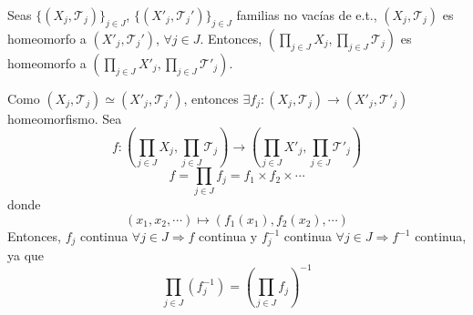 \begin{ejr}[36]
  Seas $\{ ( X_{j}, \mathcal{T}_{j} ) \}_{j \in J}$, $\{ ( X'_{j}, \mathcal{T}_{j}' ) \}_{j \in J}$ familias no vacías de e.t., $( X_{j}, \mathcal{T}_{j} )$ es homeomorfo a $( X'_{j}, \mathcal{T}_{j}' )$, $\forall j \in J$. Entonces, $( \prod_{j \in J} X_{j}, \prod_{j \in J} \mathcal{T}_{j} )$ es homeomorfo a $( \prod_{j \in J} X'_{j}, \prod_{j \in J} \mathcal{T}'_{j} )$.
\end{ejr}

\begin{sol}
  Como $( X_{j}, \mathcal{T}_{j} ) \simeq( X'_{j}, \mathcal{T}_{j}' )$, entonces $\exists f_{j} : ( X_{j}, \mathcal{T}_{j} ) \to ( X'_{j}, \mathcal{T'}_{j} )$ homeomorfismo. Sea
  \[
    f : ( \prod_{j \in J} X_{j}, \prod_{j \in J} \mathcal{T}_{j} ) \to ( \prod_{j \in J} X'_{j}, \prod_{j \in J} \mathcal{T'}_{j} )
  \]
  \[ 
    f = \prod_{j \in J} f_{j} = f_{1} \times f_{2} \times \cdots 
  \] 
  donde
  \[ 
    (x_{1}, x_{2}, \cdots) \mapsto (f_{1}(x_{1}), f_{2}(x_{2}), \cdots)
  \] 
  Entonces, $f_{j}$ continua $\forall j \in J \Rightarrow f$ continua y $f_{j}^{-1}$ continua $\forall j \in J \Rightarrow f^{-1}$ continua, ya que
  \[ 
    \prod_{j \in J}(f_{j}^{-1}) = (\prod_{j \in J} f_{j}) ^{-1} 
  \] 
\end{sol}
